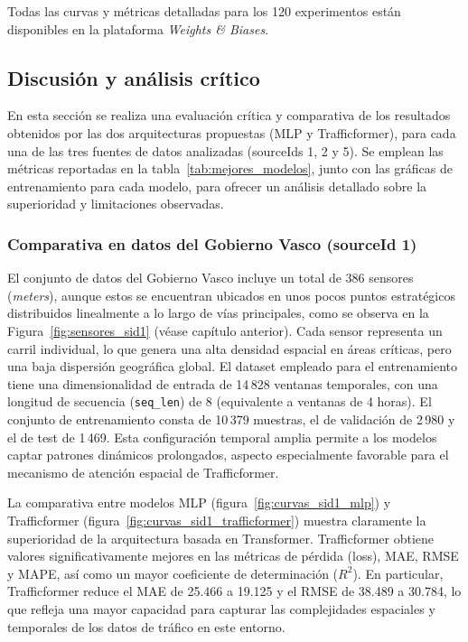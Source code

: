 Todas las curvas y métricas detalladas para los 120 experimentos están disponibles en la plataforma \textit{Weights \& Biases}.


\subsection{Discusión y análisis crítico}
\label{sec:discusion_analisis}

En esta sección se realiza una evaluación crítica y comparativa de los resultados obtenidos por las dos arquitecturas propuestas (MLP y Trafficformer), para cada una de las tres fuentes de datos analizadas (sourceIds 1, 2 y 5). Se emplean las métricas reportadas en la tabla~\ref{tab:mejores_modelos}, junto con las gráficas de entrenamiento para cada modelo, para ofrecer un análisis detallado sobre la superioridad y limitaciones observadas.

\subsubsection*{Comparativa en datos del Gobierno Vasco (sourceId 1)}

El conjunto de datos del Gobierno Vasco incluye un total de 386 sensores (\textit{meters}), aunque estos se encuentran ubicados en unos pocos puntos estratégicos distribuidos linealmente a lo largo de vías principales, como se observa en la Figura~\ref{fig:sensores_sid1} (véase capítulo anterior). Cada sensor representa un carril individual, lo que genera una alta densidad espacial en áreas críticas, pero una baja dispersión geográfica global. El dataset empleado para el entrenamiento tiene una dimensionalidad de entrada de 14\,828 ventanas temporales, con una longitud de secuencia (\texttt{seq\_len}) de 8 (equivalente a ventanas de 4 horas). El conjunto de entrenamiento consta de 10\,379 muestras, el de validación de 2\,980 y el de test de 1\,469. Esta configuración temporal amplia permite a los modelos captar patrones dinámicos prolongados, aspecto especialmente favorable para el mecanismo de atención espacial de Trafficformer.

La comparativa entre modelos MLP (figura~\ref{fig:curvas_sid1_mlp}) y Trafficformer (figura~\ref{fig:curvas_sid1_trafficformer}) muestra claramente la superioridad de la arquitectura basada en Transformer. Trafficformer obtiene valores significativamente mejores en las métricas de pérdida (loss), MAE, RMSE y MAPE, así como un mayor coeficiente de determinación ($R^2$). En particular, Trafficformer reduce el MAE de 25.466 a 19.125 y el RMSE de 38.489 a 30.784, lo que refleja una mayor capacidad para capturar las complejidades espaciales y temporales de los datos de tráfico en este entorno.

